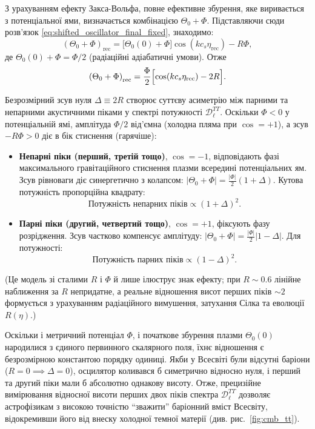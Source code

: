 З урахуванням ефекту Закса-Вольфа, повне ефективне збурення, яке виривається з потенціальної ями, визначається комбінацією $\Theta_0 + \Phi$. Підставляючи сюди розв'язок \eqref{eq:shifted_oscillator_final_fixed}, знаходимо:
\begin{equation}\label{eq:baryon_loading_shift_result}
    \left( \Theta_0 + \Phi \right)_{\mathrm{rec}} = \bigl[\Theta_0(0) + \Phi\bigr]\cos\!\left(kc_s\eta_\text{rec}\right) - R\Phi,
\end{equation}
де $\Theta_0(0)+\Phi = \Phi/2$ (радіаційні адіабатичні умови). Отже
\begin{equation*}
    \left( \Theta_0 + \Phi \right)_{\mathrm{rec}} = \frac{\Phi}{2}\Bigl[\cos(kc_s\eta_\text{rec}) - 2R\Bigr].
\end{equation*}

Безрозмірний зсув нуля $\Delta \equiv 2R$
створює суттєву асиметрію між парними та непарними акустичними
піками у спектрі потужності $\mathcal{D}_\ell^{TT}$.
Оскільки $\Phi < 0$ у потенціальній ямі, амплітуда $\Phi/2$ від'ємна
(холодна пляма при $\cos=+1$), а зсув $-R\Phi>0$ діє в бік стиснення (гарячіше):
\begin{itemize}
    \item \textbf{Непарні піки (перший, третій тощо)}, $\cos = -1$, відповідають фазі максимального гравітаційного стиснення плазми всередині потенціальних ям. Зсув рівноваги діє синергетично з колапсом: $|\Theta_0+\Phi| = \tfrac{|\Phi|}{2}(1+\Delta)$. Кутова потужність пропорційна квадрату:
    \begin{equation}
        \text{Потужність непарних піків} \propto (1+\Delta)^2.
    \end{equation}

    \item \textbf{Парні піки (другий, четвертий тощо)}, $\cos = +1$, фіксують фазу розрідження. Зсув частково компенсує амплітуду: $|\Theta_0+\Phi| = \tfrac{|\Phi|}{2}|1-\Delta|$. Для потужності:
    \begin{equation}
        \text{Потужність парних піків} \propto (1-\Delta)^2.
    \end{equation}
\end{itemize}
(Це модель зі сталими $R$ і $\Phi$ й лише ілюструє знак ефекту; при $R\sim0.6$ лінійне наближення за $R$ непридатне, а реальне відношення висот перших піків $\sim 2$ формується з урахуванням радіаційного вимушення, затухання Сілка та еволюції $R(\eta)$.)

Оскільки і метричний потенціал $\Phi$, і початкове збурення плазми $\Theta_0(0)$ народилися з єдиного первинного скалярного поля, їхнє відношення є безрозмірною константою порядку одиниці. Якби у Всесвіті були відсутні баріони ($R=0 \implies \Delta = 0$), осцилятор коливався б симетрично відносно нуля, і перший та другий піки мали б абсолютно однакову висоту. Отже, прецизійне вимірювання відносної висоти перших двох піків спектра $\mathcal{D}_\ell^{TT}$ дозволяє астрофізикам з високою точністю \enquote{зважити} баріонний вміст Всесвіту, відокремивши його від внеску холодної темної матерії (див. рис.~\ref{fig:cmb_tt}).

